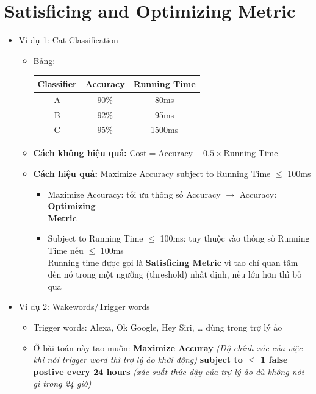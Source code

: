 \documentclass[12pt,a4paper]{report}
\begin{document}
	\section{Satisficing and Optimizing Metric}
		\begin{itemize}
			\item Ví dụ 1: Cat Classification
				\begin{itemize}
					\item Bảng: \\
						\begin{tabular}{|c | c c |}
							\hline
							Classifier & Accuracy & Running Time \\
							\hline
							A & 90\% & 80ms \\
							B & 92\% & 95ms \\
							C & 95\% & 1500ms \\
							\hline
						\end{tabular}
					\item \textbf{Cách không hiệu quả:} $ \text{Cost} = 
					\text{Accuracy} - 0.5 \times \text{Running Time} $
					\item \textbf{Cách hiệu quả: } Maximize Accuracy subject 
					to Running Time $ \leq $ 100ms
						\begin{itemize}
							\item Maximize Accuracy: tối ưu thông số Accuracy
							$\xrightarrow{}$ Accuracy: \textbf{Optimizing\\ 
							Metric}
							\item Subject to Running Time $ \leq $ 100ms: tuy 
							thuộc vào thông số Running Time nếu $ \leq $ 
							100ms\\
							Running time được gọi là \textbf{Satisficing 
							Metric} vì tao chỉ quan tâm đến nó trong một 
							ngưỡng (threshold) nhất định, nếu lớn hơn thì
							bỏ qua
						\end{itemize}
				\end{itemize}
			\item Ví dụ 2: Wakewords/Trigger words
				\begin{itemize}
					\item Trigger words: Alexa, Ok Google, Hey Siri, \ldots 
					dùng trong trợ lý ảo
					\item Ở bài toán này tao muốn: \textbf{Maximize 	
					Accuray} \textit{(Độ chính xác của việc khi nói trigger 
					word thì trợ lý ảo khởi động)} \textbf{subject to $\leq$ 
					1 false postive every 24 hours} \textit{(xác suất thức 
					dậy của trợ lý ảo dù không nói gì trong 24 giờ)}
				\end{itemize}
		\end{itemize}
\end{document}
